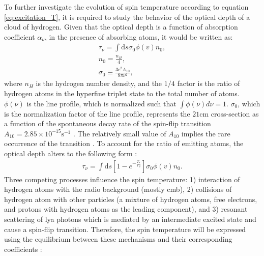 \documentclass[12pt, TexShade, letterpaper]{report}
\begin{document}

To further investigate the evolution of spin temperature according to equation \ref{eq:excitation_T}, it is required to study the behavior of the optical depth of a cloud of hydrogen. Given that the optical depth is a function of absorption coefficient $\alpha_\nu$, in the presence of absorbing atoms, it would be written as:
\begin{gather}
    \tau_\nu=\int \mathrm{d} s \sigma_0 \phi(v) n_0 ,\\
    n_0 =\frac{n_H}{4},\\
    \sigma_0 \equiv \frac{3c^2 A_{10}}{8\pi \nu^2},
\end{gather}
where $n_H$ is the hydrogen number density, and the $1/4$ factor is the ratio of hydrogen atoms in the hyperfine triplet state to the total number of atoms. $\phi(\nu)$ is the line profile, which is normalized such that $\int \phi \left(\nu\right) d\nu=1$. $\sigma_0$, which is the normalization factor of the line profile, represents the $\mathrm{21cm}$ cross-section as a function of the spontaneous decay rate of the spin-flip transition $A_{10} = 2.85 \times 10^{-15} \mathrm{s^{-1}}$ \cite{21century, low_frequency}. The relatively small value of $A_{10}$ implies the rare occurrence of the transition \cite{kit_thesis}. To account for the ratio of emitting atoms, the optical depth alters to the following form \cite{21century, low_frequency}:
\begin{gather}
    \tau_\nu=\int \mathrm{d} s\left[1- e^{ -\frac {T_*}{ T_S}}\right] \sigma_0 \phi(v) n_0.
\end{gather}
Three competing processes influence the spin temperature: 1) interaction of hydrogen atoms with the radio background (mostly \gls{cmb}), 2) collisions of hydrogen atom with other particles (a mixture of hydrogen atoms, free electrons, and protons with hydrogen atoms as the leading component), and 3) resonant scattering of \gls{lya} photons which is mediated by an intermediate excited state and cause a spin-flip transition. Therefore, the spin temperature will be expressed using the equilibrium between these mechanisms and their corresponding coefficients \cite{low_frequency,21century}:
\end{document}
